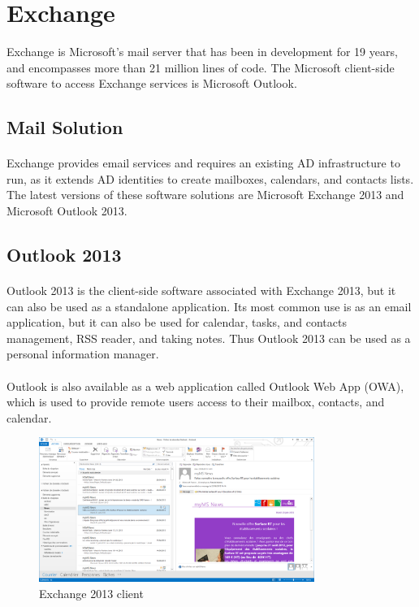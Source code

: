 \section{Exchange}

Exchange is Microsoft's mail server that has been in development for 19 years, and encompasses more than 21 million lines of code.
The Microsoft client-side software to access Exchange services is Microsoft Outlook.

\subsection{Mail Solution}
\paragraph{}
 Exchange provides email services and requires an existing AD infrastructure to run, as it extends AD identities to create mailboxes, calendars, and contacts lists\cite[Ch. 1]{redmond_microsoft_2010}.
The latest versions of these software solutions are Microsoft Exchange 2013 and Microsoft Outlook 2013.

\subsection{Outlook 2013}
\paragraph{}
Outlook 2013 is the client-side software associated with Exchange 2013, but it can also be used as a standalone application. Its most common use is as an email application, but it can also be used for calendar, tasks, and contacts management, RSS reader, and taking notes. Thus Outlook 2013 can be used as a personal information manager.

\paragraph{}
Outlook is also available as a web application called Outlook Web App (OWA), which is used to provide remote users access to their mailbox, contacts, and calendar.

\begin{figure}[H]
	\centering
	\includegraphics[width=0.8\textwidth]{Schemas/exchange2013.png}
	\caption{Exchange 2013 client}
	\label{fig:background_exchange}
\end{figure}

